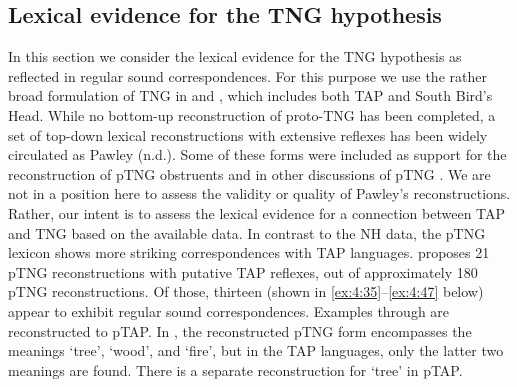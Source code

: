 \addtocounter{footnote}{-2}

\subsection{Lexical evidence for the TNG hypothesis}\label{sec:4:4.2}

In this section we consider the lexical evidence for the TNG hypothesis as reflected in regular sound correspondences. For this purpose we use the rather broad formulation of TNG in \citet{Pawley2005} and \citet{Ross2005}, which includes both TAP and South Bird's Head. While no bottom-up reconstruction of proto-TNG has been completed, a set of top-down lexical reconstructions with extensive reflexes has been widely circulated as Pawley (n.d.). Some of these forms were included as support for the reconstruction of pTNG obstruents \citep{Pawley2001} and in other discussions of pTNG \citep{Pawley1998,Pawley2012}. We are not in a position here to assess the validity or quality of Pawley's reconstructions. Rather, our intent is to assess the lexical evidence for a connection between TAP and TNG based on the available data. In contrast to the NH data, the pTNG lexicon shows more striking correspondences with TAP languages. \citet{Pawleynd} proposes 21 pTNG reconstructions with putative TAP reflexes, out of approximately
180 pTNG reconstructions. Of those, thirteen (shown in \ref{ex:4:35}--\ref{ex:4:47} below) appear to exhibit regular sound correspondences. Examples  through  are reconstructed to pTAP. In , the reconstructed pTNG form encompasses the meanings `tree', `wood', and `fire', but in the TAP languages, only the latter two meanings are found. There is a separate reconstruction for `tree' in pTAP.

